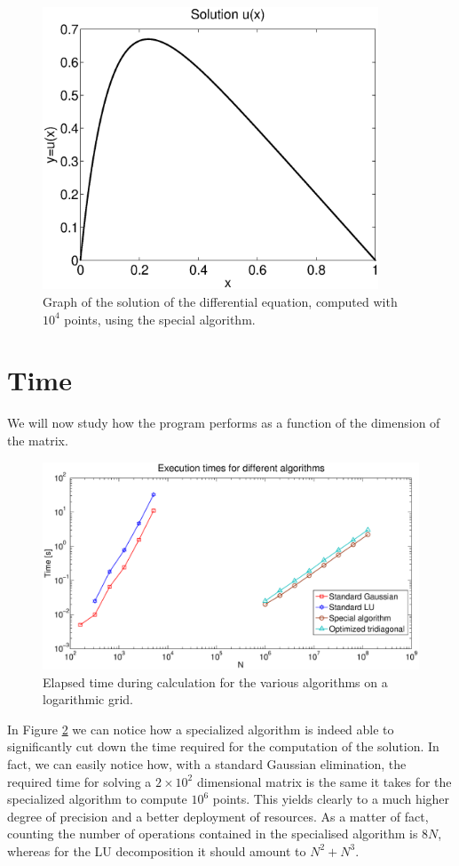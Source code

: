 \documentclass {article}
\begin{document}
\begin{figure}[H]
	\centering
	\includegraphics[width=10cm]{solution}
	\caption{Graph of the solution of the differential equation, computed with $10^4$ points, using the special algorithm.}
	\label{fig:solution}
\end{figure} 

\section{Time}

We will now study how the program performs as a function of the dimension of the matrix. 

\begin{figure}[ht]
	\centering
	\includegraphics[width=18cm]{times.eps}
	\caption{Elapsed time during calculation for the various algorithms on a logarithmic grid.}
	\label{fig:times}
\end{figure}

In Figure \ref{fig:times} we can notice how a specialized algorithm is indeed able to significantly cut down the time required for the computation of the solution.
In fact, we can easily notice how, with a standard Gaussian elimination, the required time for solving a $2 \times 10^2$  dimensional matrix is the same it takes for the specialized algorithm to compute $10^6$ points. This yields clearly to a much higher degree of precision and a better deployment of resources.
As a matter of fact, counting the number of operations contained in the specialised algorithm is $8N$, whereas for the LU decomposition it should amount to $N^2+N^3$. 
\end{document}
